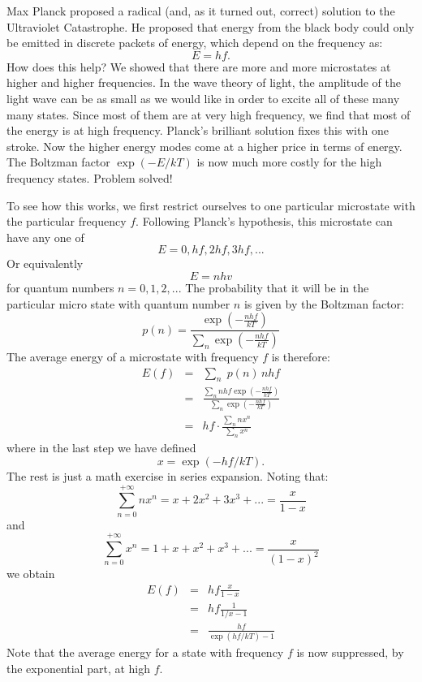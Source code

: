 \documentclass[12pt]{article}
\begin{document}
Max Planck proposed a radical (and, as it turned out, correct) solution to the Ultraviolet Catastrophe.  He proposed that energy from the black body could only be emitted in discrete packets of energy, which depend on the frequency as:
\begin{displaymath}
E = h f.
\end{displaymath}
How does this help?  We showed that there are more and more microstates at higher and higher frequencies.  In the wave theory of light, the amplitude of the light wave can be as small as we would like in order to excite all of these many many states.  Since most of them are at very high frequency, we find that most of the energy is at high frequency.  Planck's brilliant solution fixes this with one stroke. Now the higher energy modes come at a higher price in terms of energy.  The Boltzman factor $\exp(-E/kT)$ is now much more costly for the high frequency states.  Problem solved!

To see how this works, we first restrict ourselves to one particular microstate with the particular frequency $f$.  Following Planck's hypothesis, this microstate can have any one of 
\begin{displaymath}
E = 0, hf, 2hf, 3hf, ...
\end{displaymath}
Or equivalently
\begin{displaymath}
E = nhv
\end{displaymath}
for quantum numbers $n=0,1,2,...$  The probability that it will be in the particular micro state with quantum number $n$ is given by the Boltzman factor:
\begin{displaymath}
p(n) = \frac{\exp\left(-\frac{nhf}{kT}\right)}{\sum_n \exp\left(-\frac{nhf}{kT}\right)} 
\end{displaymath}
The average energy of a microstate with frequency $f$ is therefore:
\begin{eqnarray*}
E(f) & = &  \sum_n \; p(n) \, nhf \\
   & = &  \frac{\sum_n nhf \exp\left(-\frac{nhf}{kT}\right)}{\sum_n \exp\left(-\frac{nhf}{kT}\right)} \\
   & = &  hf \cdot \frac{\sum_n nx^n}{\sum_n x^n}
\end{eqnarray*}
where in the last step we have defined
\begin{displaymath}
x = \exp(-hf / kT).
\end{displaymath}
The rest is just a math exercise in series expansion.  Noting that:
\begin{displaymath}
\sum_{n=0}^{+\infty} nx^n = x + 2x^2 + 3x^3 + ... = \frac{x}{1-x}
\end{displaymath}
and
\begin{displaymath}
\sum_{n=0}^{+\infty} x^n = 1+x + x^2 + x^3 + ... = \frac{x}{(1-x)^2}
\end{displaymath}
we obtain
\begin{eqnarray*}
E(f) & = &  hf \frac{x}{1-x} \\
   & = &  hf \frac{1}{1/x-1} \\
   & = & \frac{hf}{\exp(hf/kT)-1}
\end{eqnarray*}
Note that the average energy for a state with frequency $f$ is now suppressed, by the exponential part, at high $f$.
\end{document}
